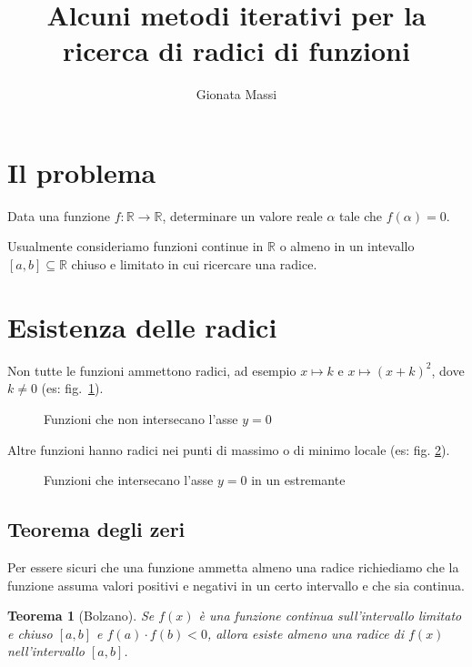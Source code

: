 \documentclass[12pt]{article}
\title{Alcuni metodi iterativi per la ricerca di radici di funzioni}
\author{Gionata Massi}
\date{} %
\theoremstyle{plain}%
\newtheorem{thm}{Teorema}[section]
\theoremstyle{definition}
\theoremstyle{remark}
\begin{document}
\maketitle

\thispagestyle{empty}%

\tableofcontents

\section{Il problema}

Data una funzione $f : \mathbb{R} \to \mathbb{R}$, determinare un valore reale $\alpha$ tale che $f(\alpha) = 0$.

Usualmente consideriamo funzioni continue in $\mathbb{R}$ o almeno in un intevallo $[a, b] \subseteq \mathbb{R}$ chiuso e limitato in cui ricercare una radice.

\section{Esistenza delle radici}

Non tutte le funzioni ammettono radici, ad esempio $x \mapsto k$ e $x \mapsto (x + k)^2$, dove $k \neq 0$ (es: fig.~\ref{fig:no_zeri}).

\begin{figure}[ht]
    \centering
    
    \caption{Funzioni che non intersecano l'asse $y = 0$}
    \label{fig:no_zeri}
\end{figure}
    
Altre funzioni hanno radici nei punti di massimo o di minimo locale (es: fig. \ref{fig:zero_estremante}).

\begin{figure}[ht]
    \centering
    
    \caption{Funzioni che intersecano l'asse $y = 0$ in un estremante}
    \label{fig:zero_estremante}
\end{figure}

\subsection{Teorema degli zeri}

Per essere sicuri che una funzione ammetta almeno una radice richiediamo che la funzione assuma valori positivi e negativi in un certo intervallo e che sia continua.

\begin{thm}[Bolzano]
Se $f (x)$ è una funzione continua sull'intervallo limitato e chiuso $[a, b]$ e $f (a) \cdot f (b) < 0$, allora esiste almeno una radice di $f (x)$ nell'intervallo $[a, b]$.
\end{thm}
\end{document}
